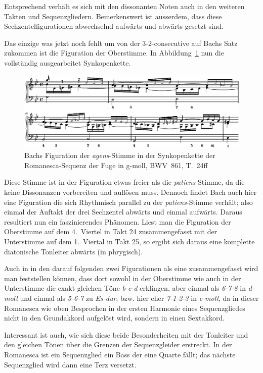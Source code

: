 Entsprechend verhält es sich mit den dissonanten Noten auch in den weiteren Takten und Sequenzgliedern.
Bemerkenswert ist ausserdem, dass diese Sechzentelfigurationen abwechselnd aufwärts und abwärts gesetzt sind.

Das einzige was jetzt noch fehlt um von der 3-2-consecutive auf Bachs Satz zukommen ist die Figuration der Oberstimme. In Abbildung~\ref{fig:bwv681-agens-verziert} nun die vollständig ausgearbeitet Synkopenkette.

\begin{figure}[htbp]
	\centering
	\includegraphics{lilypond/g-moll/render/romanesca-agens-verziert}
	\caption{Bachs Figuration der \emph{agens}-Stimme in der Synkopenkette der Romanesca-Sequenz der Fuge in g-moll, BWV~861, T.~24ff}
	\label{fig:bwv681-agens-verziert}
\end{figure}

Diese Stimme ist in der Figuration etwas freier als die \emph{patiens}-Stimme, da die keine Dissonanzen vorbereiten und auflösen muss.
Dennoch findet Bach auch hier eine Figuration die sich Rhythmisch parallel zu der \emph{patiens}-Stimme verhält; also einmal der Auftakt der drei Sechzentel abwärts und einmal aufwärts.
Daraus resultiert nun ein faszinierendes Phänomen.
Liest man die Figuration der Oberstimme auf dem 4.~Viertel in Takt 24 zusammengefasst mit der Unterstimme auf dem 1.~Viertal in Takt 25, so ergibt sich daraus eine komplette diatonische Tonleiter abwärts (in phrygisch).

Auch in in den darauf folgenden zwei Figurationen als eine zusammengefasst wird man feststellen können, dass dort sowohl in der Oberstimme wie auch in der Unterstimme die exakt gleichen Töne \emph{b-c-d} erklingen, aber einmal als \emph{6-7-8} in \emph{d-moll} und einmal als \emph{5-6-7} zu \emph{Es-dur}, bzw. hier eher \emph{7-1-2-3} in \emph{c-moll}, da in dieser Romanesca wie oben Besprochen in der ersten Harmonie eines Sequenzgliedes nicht in den Grundakkord aufgelöst wird, sondern in einen Sextakkord.

Interessant ist auch, wie sich diese beide Besonderheiten mit der Tonleiter und den gleichen Tönen über die Grenzen der Sequenzgleider erstreckt.
In der Romanesca ist ein Sequenzglied ein Bass der eine Quarte fällt; das nächste Sequenzglied wird dann eine Terz versetzt.

